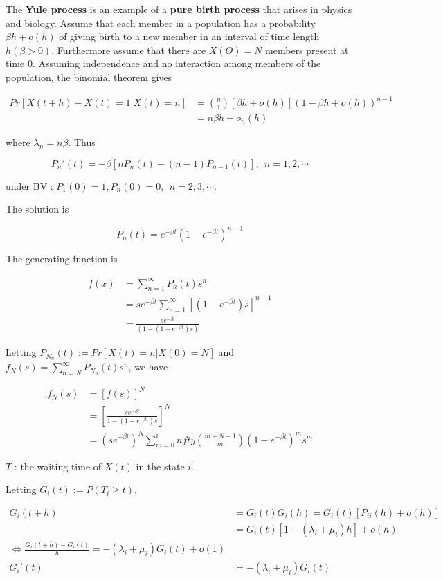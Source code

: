 \documentclass[12pt]{article}
\theoremstyle{nonumberbreak}
\begin{document}
The \textbf{Yule process} is an example of a \textbf{pure birth process} that arises in physics and biology. Assume that each member in a population has a probability $\beta h + o(h)$ of giving birth to a new member in an interval of time length $h (\beta > 0)$. Furthermore assume that there are $X(O) = N$ members present at time $0$. Assuming independence and no interaction among members of the population, the binomial theorem gives

$$
\begin{aligned}
Pr[X(t+h) - X(t) = 1 | X(t) = n] &= \binom{n}{1} \left[ \beta h + o(h) \right] \left( 1 - \beta h + o(h) \right)^{n-1} \\[8pt]
&= n\beta h + o_n(h)
\end{aligned}
$$

where $\lambda_n = n \beta$. Thus

$$
P_n'(t) = -\beta [nP_n(t) - (n-1) P_{n-1}(t) ], \ \ n=1,2,\cdots
$$

under BV : $P_1(0)=1, P_n(0)=0, \ \ n=2,3,\cdots$. 

The solution is 

$$
P_n(t) = e^{-\beta t} (1 - e^{-\beta t})^{n-1}
$$

The generating function is 

$$
\begin{aligned}
f(x) &= \sum_{n=1}^\infty P_n(t) s^n \\[8pt]
&= s e^{-\beta t} \sum_{n=1}^\infty \left[ (1-e^{-\beta t}) s \right]^{n-1} \\[8pt]
&= \frac{se^{-\beta t}}{ (1 - (1-e^{-\beta t})s) }
\end{aligned}
$$

Letting $P_{N_n}(t) := Pr[X(t) = n | X(0) = N]$ and $f_N(s) = \sum_{n=N}^\infty P_{N_n}(t)s^n$, we have


$$
\begin{aligned}
f_N(s) &= [f(s)]^N \\[8pt]
&= \left[ \frac{se^{-\beta t}}{1 - (1-e^{-\beta t})s} \right]^N \\[8pt]
&= (s e^{-\beta t})^N \sum_{m=0}^infty \binom{m+N-1}{m} (1-e^{-\beta t})^m s^m
\end{aligned}
$$



$T$ : the waiting time of $X(t)$ in the state $i$. 


Letting $G_i(t) := P(T_i \ge t)$, 

$$
\begin{aligned}
G_i (t+h) &= G_i(t) G_i(h) = G_i(t) \left[ P_{ii}(h) + o(h) \right] \\[8pt]
&= G_i(t) [ 1- (\lambda_i + \mu_i)h ] + o(h) \\[10pt]
\Leftrightarrow \frac{ G_i(t+h) - G_i(t)  }{ h } = -(\lambda_i + \mu_i) G_i(t) + o(1) \\[8pt]
G_i'(t) &= -(\lambda_i + \mu_i) G_i(t)
\end{aligned}
$$
\end{document}
